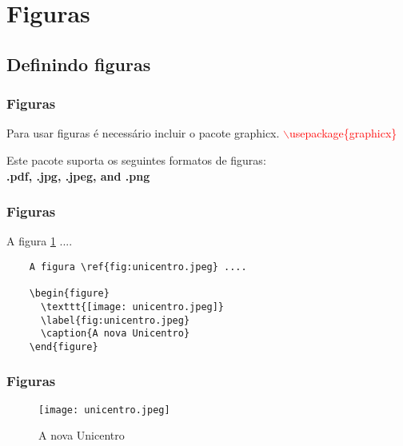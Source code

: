 \section{Figuras}
\subsection{Definindo figuras}
\begin{frame}
  \frametitle{Figuras}
   Para usar figuras é necessário incluir o pacote graphicx.
   \textcolor{red}{$\backslash$usepackage\{graphicx\}}

   Este pacote suporta os seguintes formatos de figuras: \\
   \textbf{.pdf, .jpg, .jpeg, and .png}

\end{frame}


\begin{frame}[fragile]
  \frametitle{Figuras}

  A figura \ref{fig:unicentro.jpeg} ....

  \begin{verbatim}
    A figura \ref{fig:unicentro.jpeg} ....

    \begin{figure}
      \texttt{[image: unicentro.jpeg]}
      \label{fig:unicentro.jpeg}
      \caption{A nova Unicentro}
    \end{figure}
  \end{verbatim}

\end{frame}


\begin{frame}[fragile]
  \frametitle{Figuras}


    \begin{figure}
      \texttt{[image: unicentro.jpeg]}
      \label{fig:unicentro.jpeg}
      \caption{A nova Unicentro}
    \end{figure}

\end{frame}
